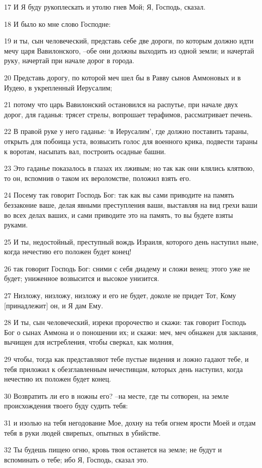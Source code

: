 \par 17 И Я буду рукоплескать и утолю гнев Мой; Я, Господь, сказал.
\par 18 И было ко мне слово Господне:
\par 19 и ты, сын человеческий, представь себе две дороги, по которым должно идти мечу царя Вавилонского, --обе они должны выходить из одной земли; и начертай руку, начертай при начале дорог в города.
\par 20 Представь дорогу, по которой меч шел бы в Равву сынов Аммоновых и в Иудею, в укрепленный Иерусалим;
\par 21 потому что царь Вавилонский остановился на распутье, при начале двух дорог, для гаданья: трясет стрелы, вопрошает терафимов, рассматривает печень.
\par 22 В правой руке у него гаданье: `в Иерусалим', где должно поставить тараны, открыть для побоища уста, возвысить голос для военного крика, подвести тараны к воротам, насыпать вал, построить осадные башни.
\par 23 Это гаданье показалось в глазах их лживым; но так как они клялись клятвою, то он, вспомнив о таком их вероломстве, положил взять его.
\par 24 Посему так говорит Господь Бог: так как вы сами приводите на память беззаконие ваше, делая явными преступления ваши, выставляя на вид грехи ваши во всех делах ваших, и сами приводите это на память, то вы будете взяты руками.
\par 25 И ты, недостойный, преступный вождь Израиля, которого день наступил ныне, когда нечестию его положен будет конец!
\par 26 так говорит Господь Бог: сними с себя диадему и сложи венец; этого уже не будет; униженное возвысится и высокое унизится.
\par 27 Низложу, низложу, низложу и его не будет, доколе не придет Тот, Кому [принадлежит] он, и Я дам Ему.
\par 28 И ты, сын человеческий, изреки пророчество и скажи: так говорит Господь Бог о сынах Аммона и о поношении их; и скажи: меч, меч обнажен для заклания, вычищен для истребления, чтобы сверкал, как молния,
\par 29 чтобы, тогда как представляют тебе пустые видения и ложно гадают тебе, и тебя приложил к обезглавленным нечестивцам, которых день наступил, когда нечестию их положен будет конец.
\par 30 Возвратить ли его в ножны его? --на месте, где ты сотворен, на земле происхождения твоего буду судить тебя:
\par 31 и изолью на тебя негодование Мое, дохну на тебя огнем ярости Моей и отдам тебя в руки людей свирепых, опытных в убийстве.
\par 32 Ты будешь пищею огню, кровь твоя останется на земле; не будут и вспоминать о тебе; ибо Я, Господь, сказал это.

